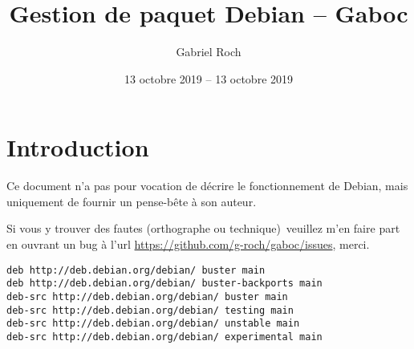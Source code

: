 


\title{Gestion de paquet Debian -- Gaboc}
\author{Gabriel Roch}
\date{13 octobre 2019 -- 13 octobre 2019}



\maketitle
\tableofcontents

\section{Introduction}

Ce document n'a pas pour vocation de décrire le fonctionnement de Debian, 
mais uniquement de fournir un pense-bête à son auteur.

Si vous y trouver des fautes (orthographe ou technique) veuillez m'en faire part
en ouvrant un bug à l'url \url{https://github.com/g-roch/gaboc/issues}, merci.

\begin{lstlisting}
deb http://deb.debian.org/debian/ buster main
deb http://deb.debian.org/debian/ buster-backports main
deb-src http://deb.debian.org/debian/ buster main
deb-src http://deb.debian.org/debian/ testing main
deb-src http://deb.debian.org/debian/ unstable main
deb-src http://deb.debian.org/debian/ experimental main
\end{lstlisting}







